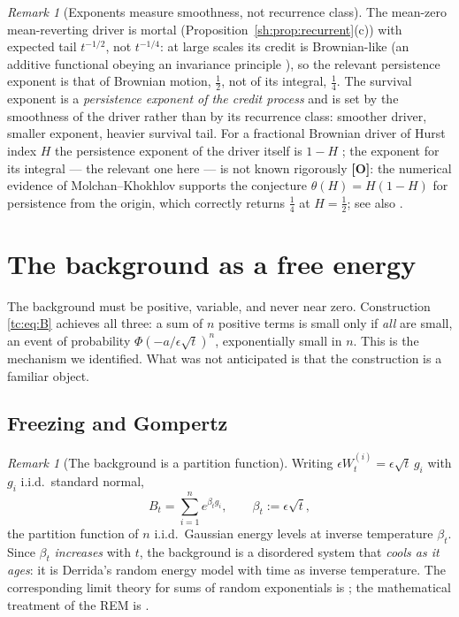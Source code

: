 \documentclass[11pt]{article}
\numberwithin{equation}{section}
\theoremstyle{plain}
\theoremstyle{definition}
\theoremstyle{remark}
\newtheorem{remark}[theorem]{Remark}
\begin{document}
\begin{remark}[Exponents measure smoothness, not recurrence class]
\label{sh:rem:smoothness}
The mean-zero mean-reverting driver is mortal
(Proposition~\ref{sh:prop:recurrent}(c)) with expected tail $t^{-1/2}$, not
$t^{-1/4}$: at large scales its credit is Brownian-like (an additive
functional obeying an invariance principle \cite{Bha82}), so the relevant
persistence exponent is that of Brownian motion, $\tfrac12$, not of its
integral, $\tfrac14$. The survival exponent is a \emph{persistence exponent
of the credit process} and is set by the smoothness of the driver rather
than by its recurrence class: smoother driver, smaller exponent, heavier
survival tail. For a fractional Brownian driver of Hurst index $H$ the
persistence exponent of the driver itself is $1-H$ \cite{Mol99}; the
exponent for its integral --- the relevant one here --- is not known
rigorously \textbf{[O]}: the numerical evidence of Molchan--Khokhlov
\cite{MK04} supports the conjecture $\theta(H)=H(1-H)$ for persistence
from the origin, which correctly returns $\tfrac14$ at $H=\tfrac12$;
see also \cite{AS15}.
\end{remark}

\section{The background as a free energy}\label{app:background}

\label{tc:sub:background}

The background must be positive, variable, and never near zero.
Construction \eqref{tc:eq:B} achieves all three: a sum of $n$ positive
terms is small only if \emph{all} are small, an event of probability
$\Phi(-a/\epsilon\sqrt t)^{n}$, exponentially small in $n$. This is the
mechanism we identified. What was not anticipated is that the
construction is a familiar object.

\subsection{Freezing and Gompertz}\label{tc:subsub:freezing}

\begin{remark}[The background is a partition function]
\label{tc:rem:partition}
Writing $\epsilon W^{(i)}_t=\epsilon\sqrt t\,g_i$ with $g_i$ i.i.d.\
standard normal,
\[
B_t=\sum_{i=1}^{n}e^{\beta_t g_i},\qquad \beta_t:=\epsilon\sqrt t,
\]
the partition function of $n$ i.i.d.\ Gaussian energy levels at inverse
temperature $\beta_t$. Since $\beta_t$ \emph{increases} with $t$, the
background is a disordered system that \emph{cools as it ages}: it is
Derrida's random energy model \cite{Der81,Der80} with time as inverse
temperature. The corresponding limit theory for sums of random
exponentials is \cite{BBM05}; the mathematical treatment of the REM is
\cite{Bov06}.
\end{remark}
\end{document}
